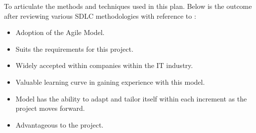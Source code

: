 To articulate the methods and techniques used in this plan. Below is the outcome after reviewing various SDLC methodologies with reference to \cite{TP-16}:
\begin{itemize}
	\item Adoption of the Agile Model.
	\item Suits the requirements for this project.
	\item Widely accepted within companies within the IT industry.
	\item Valuable learning curve in gaining experience with this model.
	\item Model has the ability to adapt and tailor itself within each increment as the project moves forward.
	\item Advantageous to the project.
	

\end{itemize}

